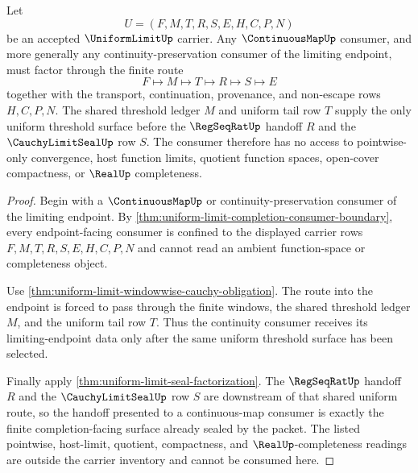 \begin{theorem}
\label{thm:uniformlimit-continuous-map-handoff}
Let
$$
U=(F,M,T,R,S,E,H,C,P,N)
$$
be an accepted $\UniformLimitUp$ carrier. Any $\ContinuousMapUp$ consumer, and more generally any continuity-preservation consumer of the limiting endpoint, must factor through the finite route
$$
F \longmapsto M \longmapsto T \longmapsto R \longmapsto S \longmapsto E
$$
together with the transport, continuation, provenance, and non-escape rows $H,C,P,N$. The shared threshold ledger $M$ and uniform tail row $T$ supply the only uniform threshold surface before the $\RegSeqRatUp$ handoff $R$ and the $\CauchyLimitSealUp$ row $S$. The consumer therefore has no access to pointwise-only convergence, host function limits, quotient function spaces, open-cover compactness, or $\RealUp$ completeness.
\end{theorem}
\begin{proof}
Begin with a $\ContinuousMapUp$ or continuity-preservation consumer of the limiting endpoint. By \autoref{thm:uniform-limit-completion-consumer-boundary}, every endpoint-facing consumer is confined to the displayed carrier rows $F,M,T,R,S,E,H,C,P,N$ and cannot read an ambient function-space or completeness object.

Use \autoref{thm:uniform-limit-windowwise-cauchy-obligation}. The route into the endpoint is forced to pass through the finite windows, the shared threshold ledger $M$, and the uniform tail row $T$. Thus the continuity consumer receives its limiting-endpoint data only after the same uniform threshold surface has been selected.

Finally apply \autoref{thm:uniform-limit-seal-factorization}. The $\RegSeqRatUp$ handoff $R$ and the $\CauchyLimitSealUp$ row $S$ are downstream of that shared uniform route, so the handoff presented to a continuous-map consumer is exactly the finite completion-facing surface already sealed by the packet. The listed pointwise, host-limit, quotient, compactness, and $\RealUp$-completeness readings are outside the carrier inventory and cannot be consumed here.
\end{proof}

